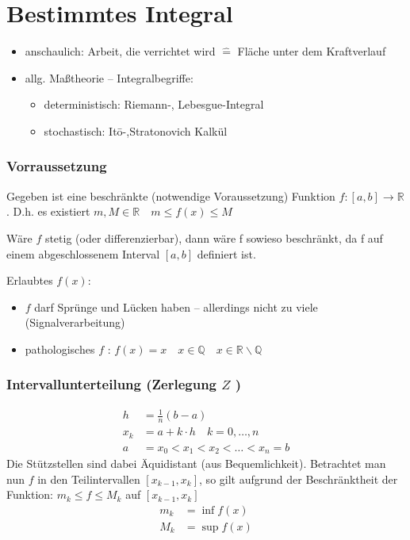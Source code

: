 
\section{Bestimmtes Integral}
\label{sub:bestInt}

\begin{itemize}
	\item anschaulich: Arbeit, die verrichtet wird \( \hat{=} \) Fläche unter dem Kraftverlauf
	\item allg. Maßtheorie – Integralbegriffe: 
	\begin{itemize}
		\item deterministisch: Riemann-, Lebesgue-Integral
		\item stochastisch: It\={o}-,Stratonovich Kalkül
	\end{itemize}
\end{itemize}

\subsubsection{Vorraussetzung}

Gegeben ist eine beschränkte (notwendige Voraussetzung) Funktion \( f:[a,b]\rightarrow \mathbb{R} \). D.h. es existiert \(  m, M \in \mathbb{R} \quad m \leq f(x) \leq M \)

\begin{note}
	Wäre \( f \) stetig (oder differenzierbar), dann wäre f sowieso beschränkt, da f auf einem abgeschlossenem Interval \( [a,b] \) definiert ist.
\end{note}


Erlaubtes \( f(x) \):
\begin{itemize}
	\item \( f \) darf Sprünge und Lücken haben – allerdings nicht zu viele (Signalverarbeitung)
	\item pathologisches \( f \) : \( f(x) = x \quad x \in \mathbb{Q} \quad x \in \mathbb{R}\backslash\mathbb{Q} \)
\end{itemize}

\subsubsection{Intervallunterteilung  (Zerlegung $ Z $ ) }

\begin{align*}
	h &= \frac{1}{n} (b-a) \\
	x_k &= a+k \cdot h \quad k=0,\ldots,n \\
	a &= x_0<x_1<x_2<\ldots<x_n=b 
\end{align*}
Die Stützstellen sind dabei Äquidistant (aus Bequemlichkeit). Betrachtet man nun \(f\) in den Teilintervallen \( [x_{k-1},x_k] \), so gilt aufgrund der Beschränktheit der Funktion: \( m_k \leq f \leq M_k \) auf \( [x_{k-1},x_k] \)
\begin{align*}
	m_k &= \inf f(x) \\
	M_k &= \sup f(x)
\end{align*}

